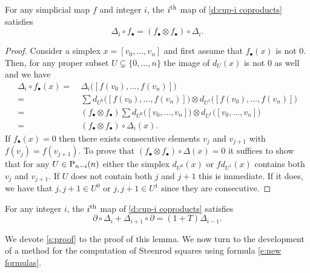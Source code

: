 \begin{lemma} \label{l:naturality}
	For any simplicial map $f$ and integer $i$, the $i^\th$ map of \cref{d:cup-i coproducts} satisfies
	\begin{equation*}
	\Delta_i \circ f_\bullet = (f_\bullet \otimes f_\bullet) \circ \Delta_i.
	\end{equation*}
\end{lemma}

\begin{proof}
	Consider a simplex $x = [v_0, \dots, v_n]$ and first assume that $f_\bullet(x)$ is not $0$.
	Then, for any proper subset $U \subsetneq \{0, \dots, n\}$ the image of $d_U(x)$ is not $0$ as well and we have
	\begin{align*}
	\Delta_i \circ f_\bullet(x) =\ &
	\Delta_i \big([f(v_0), \dots, f(v_n)]\big) \\ =\ &
	\sum d_{U^0} \big([f(v_0), \dots, f(v_n)]\big) \otimes d_{U^1} \big([f(v_0), \dots, f(v_n)]\big) \\ =\ &
	(f_\bullet \otimes f_\bullet) \sum d_{U^0} \big([v_0, \dots, v_n]\big) \otimes d_{U^1} \big([v_0, \dots, v_n]\big) \\ =\ &
	(f_\bullet \otimes f_\bullet) \circ \Delta_i(x).
	\end{align*}
	If $f_\bullet(x) = 0$ then there exists consecutive elements $v_j$ and $v_{j+1}$ with $f(v_j) = f(v_{j+1})$.
	To prove that $(f_\bullet \otimes f_\bullet) \circ \Delta(x) = 0$ it suffices to show that for any $U \in \P_{n-i}(n)$ either the simplex $d_{U^0}(x)$ or $f d_{U^1}(x)$ contains both $v_j$ and $v_{j+1}$.
	If $U$ does not contain both $j$ and $j+1$ this is immediate.
	If it does, we have that $j, j+1 \in U^0$ or $j, j+1 \in U^1$ since they are consecutive.
\end{proof}

\begin{lemma} \label{l:main}
	For any integer $i$, the $i^\th$ map of \cref{d:cup-i coproducts} satisfies
	\begin{equation*}
	\partial \circ \Delta_{i} + \Delta_{i+1} \circ \partial = (1+T) \Delta_{i-1}.
	\end{equation*}
\end{lemma}

We devote \cref{s:proof} to the proof of this lemma.
We now turn to the development of a method for the computation of Steenrod squares using formula \eqref{e:new formulas}.